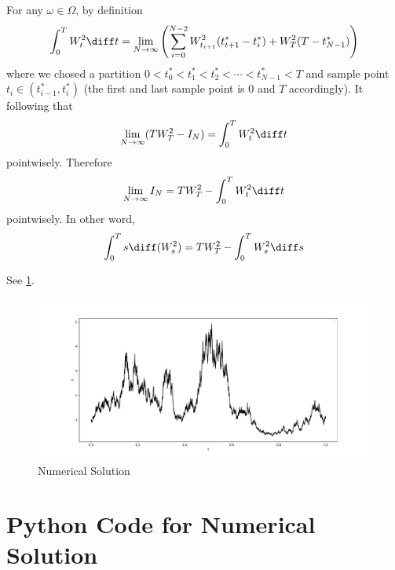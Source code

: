     For any $\omega\in\Omega$, by definition
    \[\int_0^TW_t^2\diff t
    =\lim_{N\to\infty}\left(\sum_{i=0}^{N-2}W_{t_{i+1}}^2(t^*_{t+1}-t^*_i)
    +W_T^2(T-t_{N-1}^*)\right)\]
    where we chosed a partition
    $0<t_0^*<t_1^*<t_2^*<\cdots<t_{N-1}^*<T$ and
    sample point $t_i\in(t_{i-1}^*,t_i^*)$
    (the first and last sample point is $0$ and $T$
    accordingly).
    It following that
    \[\lim_{N\to\infty}(TW_T^2-I_N)
    =\int_0^TW_t^2\diff t\]
    pointwisely.
    Therefore
    \[\lim_{N\to\infty}I_N
    =TW_T^2-\int_0^TW_t^2\diff t\]
    pointwisely. In other word,
    \[\int_0^Ts\diff(W_s^2)=TW_T^2-\int_0^TW_s^2\diff s\]



    \problem
    See \cref{fig:numerical solution}.
    \begin{figure}[h]
        \centering
        \includegraphics[width=\linewidth]{solution}
        \caption{Numerical Solution}
        \label{fig:numerical solution}
    \end{figure}

    \appendix
    \section{Python Code for Numerical Solution}
    